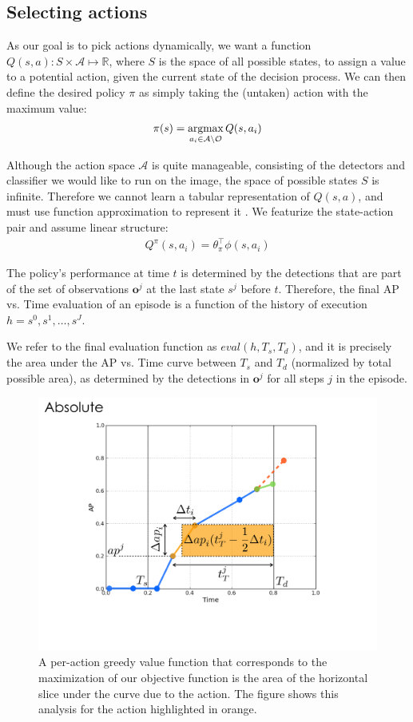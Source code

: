 \subsection{Selecting actions} \label{sec:value}
As our goal is to pick actions dynamically, we want a function $Q(s,a): S \times \mathcal{A} \mapsto \mathbb{R}$, where $S$ is the space of all possible states, to assign a value to a potential action, given the current state of the decision process.
We can then define the desired policy $\pi$ as simply taking the (untaken) action with the maximum value:
\begin{align}
\pi(s) = \argmax_{a_i \in \mathcal{A} \setminus \mathcal{O}} Q(s,a_i)
\end{align}

Although the action space $\mathcal{A}$ is quite manageable, consisting of the detectors and classifier we would like to run on the image, the space of possible states $S$ is infinite.
Therefore we cannot learn a tabular representation of $Q(s,a)$, and must use function approximation to represent it \cite{Sutton1998}.
We featurize the state-action pair and assume linear structure:
\begin{align}
Q^\pi(s,a_i) = \theta_\pi^\top  \phi(s,a_i)
\end{align}

The policy's performance at time $t$ is determined by the detections that are part of the set of observations $\mathbf{o}^j$ at the last state $s^j$ before $t$.
Therefore, the final AP vs. Time evaluation of an episode is a function of the history of execution $h=s^0,s^1,\dots,s^J$.

We refer to the final evaluation function as $eval(h,T_s,T_d)$, and it is precisely the area under the AP vs. Time curve between $T_s$ and $T_d$ (normalized by total possible area), as determined by the detections in $\mathbf{o}^j$ for all steps $j$ in the episode.

\begin{figure}[h!]
  \centering
  \includegraphics[width=0.56\linewidth]{../figures/apvst_expl.pdf}
  \caption{ A per-action greedy value function that corresponds to the maximization of our objective function is the area of the horizontal slice under the curve due to the action. The figure shows this analysis for the action highlighted in orange.}
  \label{fig:rewards}
\end{figure}

